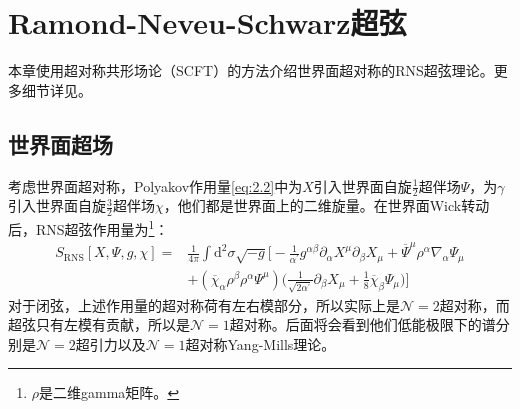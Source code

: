 \chapter{Ramond-Neveu-Schwarz超弦}
本章使用超对称共形场论（SCFT）的方法介绍世界面超对称的RNS超弦理论。更多细节详见\cite{Green:2012oqa,Green:2012pqa}。
\section{世界面超场}
考虑世界面超对称，Polyakov作用量\ref{eq:2.2}中为$X$引入世界面自旋$\frac12$超伴场$\Psi$，为$\gamma$引入世界面自旋$\frac32$超伴场$\chi$，他们都是世界面上的二维旋量。在世界面Wick转动后，RNS超弦作用量为\footnote{$\rho$是二维gamma矩阵。}：
\begin{equation}
	\begin{aligned}
		S_{\mathrm{RNS}}[X,\Psi,g,\chi]=&\frac1{4\pi}\int\mathrm{d}^2\sigma\sqrt{-g}\Big[-\frac1{\alpha^{\prime}}g^{\alpha\beta}\partial_\alpha X^\mu\partial_\beta X_\mu+\overline{\Psi}^\mu\rho^\alpha\nabla_\alpha\Psi_\mu\\&+(\overline{\chi}_\alpha\rho^\beta\rho^\alpha\Psi^\mu)\Big(\frac1{\sqrt{2\alpha^{\prime}}}\partial_\beta X_\mu+\frac18\overline{\chi}_\beta\Psi_\mu\Big)\Big]
	\end{aligned}
\end{equation}
对于闭弦，上述作用量的超对称荷有左右模部分，所以实际上是$\mathcal{N}=2$超对称，而超弦只有左模有贡献，所以是$\mathcal{N}=1$超对称。后面将会看到他们低能极限下的谱分别是$\mathcal{N}=2$超引力以及$\mathcal{N}=1$超对称Yang-Mills理论。

